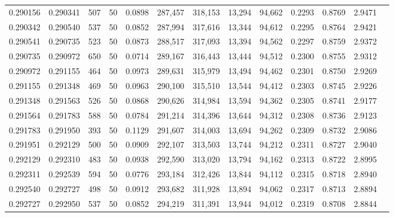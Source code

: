 \begin{tabular}{rrrrrrrrrrrrr}
0.290156 & 0.290341 &   507 &  50 &                                     0.0898 & 287,457 & 318,153 &  13,294 &  94,662 & 0.2293 & 0.8769 & 2.9471 \\
0.290342 & 0.290540 &   537 &  50 &                                     0.0852 & 287,994 & 317,616 &  13,344 &  94,612 & 0.2295 & 0.8764 & 2.9421 \\
0.290541 & 0.290735 &   523 &  50 &                                     0.0873 & 288,517 & 317,093 &  13,394 &  94,562 & 0.2297 & 0.8759 & 2.9372 \\
0.290735 & 0.290972 &   650 &  50 &                                     0.0714 & 289,167 & 316,443 &  13,444 &  94,512 & 0.2300 & 0.8755 & 2.9312 \\
0.290972 & 0.291155 &   464 &  50 &                                     0.0973 & 289,631 & 315,979 &  13,494 &  94,462 & 0.2301 & 0.8750 & 2.9269 \\
0.291155 & 0.291348 &   469 &  50 &                                     0.0963 & 290,100 & 315,510 &  13,544 &  94,412 & 0.2303 & 0.8745 & 2.9226 \\
0.291348 & 0.291563 &   526 &  50 &                                     0.0868 & 290,626 & 314,984 &  13,594 &  94,362 & 0.2305 & 0.8741 & 2.9177 \\
0.291564 & 0.291783 &   588 &  50 &                                     0.0784 & 291,214 & 314,396 &  13,644 &  94,312 & 0.2308 & 0.8736 & 2.9123 \\
0.291783 & 0.291950 &   393 &  50 &                                     0.1129 & 291,607 & 314,003 &  13,694 &  94,262 & 0.2309 & 0.8732 & 2.9086 \\
0.291951 & 0.292129 &   500 &  50 &                                     0.0909 & 292,107 & 313,503 &  13,744 &  94,212 & 0.2311 & 0.8727 & 2.9040 \\
0.292129 & 0.292310 &   483 &  50 &                                     0.0938 & 292,590 & 313,020 &  13,794 &  94,162 & 0.2313 & 0.8722 & 2.8995 \\
0.292311 & 0.292539 &   594 &  50 &                                     0.0776 & 293,184 & 312,426 &  13,844 &  94,112 & 0.2315 & 0.8718 & 2.8940 \\
0.292540 & 0.292727 &   498 &  50 &                                     0.0912 & 293,682 & 311,928 &  13,894 &  94,062 & 0.2317 & 0.8713 & 2.8894 \\
0.292727 & 0.292950 &   537 &  50 &                                     0.0852 & 294,219 & 311,391 &  13,944 &  94,012 & 0.2319 & 0.8708 & 2.8844 \\

\end{tabular}
